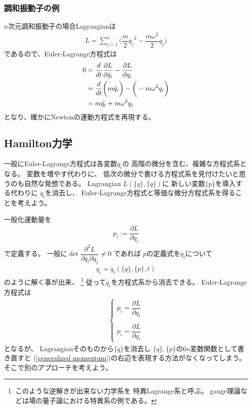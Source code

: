 \subsubsection{調和振動子の例}

$n$次元調和振動子の場合Lagrangianは
\begin{align}
  L = \sum_{j=1}^n
  \bigg(
    \dfrac{m}{2}\dot{q_j}^2
  -
    \dfrac{m\omega^2}{2} q_j
  \bigg)
\end{align}
であるので、Euler-Lagrange方程式は
\begin{align}
  0 &= 
  \dfrac{d}{dt}\dfrac{\partial L}{\partial \dot{q_i} }
  - \dfrac{\partial L}{\partial q_i }
\notag\\&=
  \dfrac{d}{dt}
  \bigg(
    m\dot{q_i}
  \bigg)
  - 
  \bigg(
  -
    m\omega^2 q_i
  \bigg)
\notag\\&=
    m\ddot{q_i}
  +
    m\omega^2 q_i
\end{align}
となり、確かにNewtonの運動方程式を再現する。

\subsection{Hamilton力学}

一般にEuler-Lagrange方程式は各変数$q_i$の
高階の微分を含む、複雑な方程式系となる。
変数を増やす代わりに、
低次の微分で書ける方程式系を見付けたいと思うのも自然な発想である。
Lagrangian $L(\{q\},\{\dot{q}\})$に
新しい変数$\{p\}$を導入する代わりに
$\dot{q}_i$を消去し、
Euler-Lagrange方程式と等価な微分方程式系を得ることを考えよう。

一般化運動量を
\begin{align}
  p_i := \dfrac{\partial L}{\partial \dot{q_i}}
\label{generalized momentum}
\end{align}
で定義する。
一般に$\det \dfrac{\partial^2 L}{\partial \dot{q_i} \partial \dot{q_j} } \neq 0 $
であれば
$p$の定義式を$\dot{q_i}$について
\begin{align}
  \dot{q_i} = \dot{q_i}(\{q\},\{p\},t)
\end{align}
のように解く事が出来、
\footnote{
  このような逆解きが出来ない力学系を
  特異Lagrange系と呼ぶ。
  gauge理論などは場の量子論における特異系の例である。
}
従って$\dot{q_i}$を方程式系から消去できる。
Euler-Lagrange方程式は
\begin{align}
  \begin{cases}
    \dot{p_i} = \dfrac{\partial L}{\partial q_i}
\\    \\
      p_i = \dfrac{\partial L}{\partial \dot{q_i}}   
  \end{cases}
\label{Euler-Lagrange with p}
\end{align}
となるが、
Lagrangianそのものから$\{\dot{q}\}$を消去し
$\{q\},\{p\}$の$6n$変数関数として書き直すと
(\ref{generalized momentum})の右辺を表現する方法がなくなってしまう。
そこで別のアプローチを考えよう。

